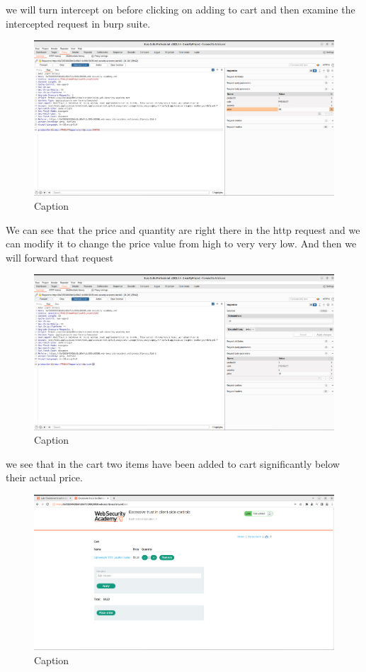 \documentclass[
	a4paper, %
	12pt, %
]{CSSullivanBusinessReport}
\begin{document}
\begin{fullwidth}
we will turn intercept on before clicking on adding to cart and then examine the intercepted request in burp suite.

\begin{figure}[H]
    \centering
    \includegraphics[width=1\textwidth]{Images/anikaScreensots/lab3.png}
    \caption{Caption}
    \label{fig:enter-label}
\end{figure}
We can see that the price and quantity are right there in the http request and we can modify it to change the price value from high to very very low. And then we will forward that request
\begin{figure}[H]
    \centering
    \includegraphics[width=1\textwidth]{Images/anikaScreensots/lab4.png}
    \caption{Caption}
    \label{fig:enter-label}
\end{figure}

we see that in the cart two items have been added to cart significantly below their actual price.
\begin{figure}[H]
    \centering
    \includegraphics[width=1\textwidth]{Images/anikaScreensots/lab5.png}
    \caption{Caption}
    \label{fig:enter-label}
\end{figure}
\end{fullwidth}
\end{document}
